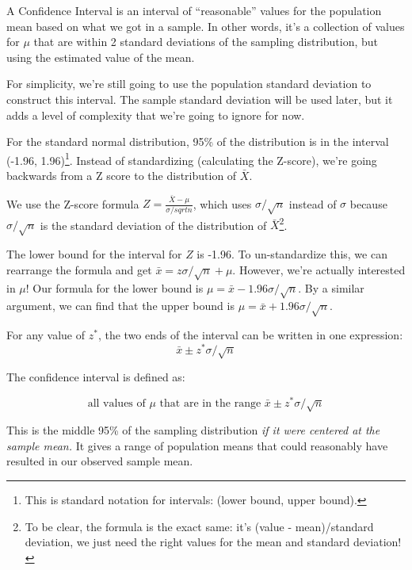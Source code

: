 \documentclass[
  letterpaper,
  DIV=11,
  numbers=noendperiod,
  oneside]{scrreprt}
\begin{document}
A Confidence Interval is an interval of ``reasonable'' values for the
population mean based on what we got in a sample. In other words, it's a
collection of values for \(\mu\) that are within 2 standard deviations
of the sampling distribution, but using the estimated value of the mean.

For simplicity, we're still going to use the population standard
deviation to construct this interval. The sample standard deviation will
be used later, but it adds a level of complexity that we're going to
ignore for now.

For the standard normal distribution, 95\% of the distribution is in the
interval (-1.96, 1.96)\footnote{This is standard notation for intervals:
  (lower bound, upper bound).}. Instead of standardizing (calculating
the Z-score), we're going backwards from a Z score to the distribution
of \(\bar X\).

We use the Z-score formula \(Z = \frac{\bar X-\mu}{\sigma/sqrt{n}}\),
which uses \(\sigma/\sqrt{n}\) instead of \(\sigma\) because
\(\sigma/\sqrt{n}\) is the standard deviation of the distribution of
\(\bar X\)\footnote{To be clear, the formula is the exact same: it's
  (value - mean)/standard deviation, we just need the right values for
  the mean and standard deviation!}.

The lower bound for the interval for \(Z\) is -1.96. To un-standardize
this, we can rearrange the formula and get
\(\bar x = z\sigma/\sqrt{n} + \mu\). However, we're actually interested
in \(\mu\)! Our formula for the lower bound is
\(\mu = \bar x-1.96\sigma/\sqrt{n}\). By a similar argument, we can find
that the upper bound is \(\mu = \bar x + 1.96\sigma/\sqrt{n}\).

For any value of \(z^*\), the two ends of the interval can be written in
one expression: \[
\bar x\pm z^*\sigma/\sqrt{n}
\]

\begin{tcolorbox}[enhanced jigsaw, toprule=.15mm, colbacktitle=quarto-callout-note-color!10!white, title=\textcolor{quarto-callout-note-color}{\faInfo}\hspace{0.5em}{Confidence Interval for the Population Mean}, arc=.35mm, colframe=quarto-callout-note-color-frame, colback=white, titlerule=0mm, left=2mm, bottomtitle=1mm, bottomrule=.15mm, breakable, opacitybacktitle=0.6, leftrule=.75mm, toptitle=1mm, coltitle=black, rightrule=.15mm, opacityback=0]

The confidence interval is defined as:

\[
\text{all values of } \mu \text{ that are in the range } \bar x \pm z^*\sigma/\sqrt{n}
\]

This is the middle 95\% of the sampling distribution \emph{if it were
centered at the sample mean.} It gives a range of population means that
could reasonably have resulted in our observed sample mean.

\end{tcolorbox}
\end{document}
